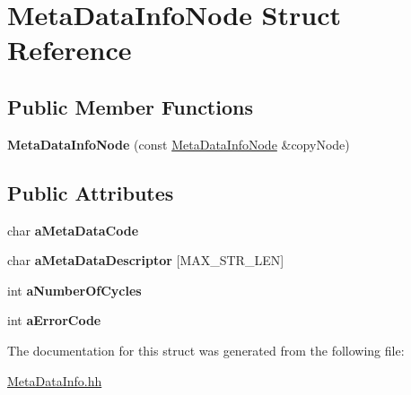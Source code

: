 \hypertarget{struct_meta_data_info_node}{}\section{Meta\+Data\+Info\+Node Struct Reference}
\label{struct_meta_data_info_node}
\subsection*{Public Member Functions}
\begin{DoxyCompactItemize}
\item 
{\bfseries Meta\+Data\+Info\+Node} (const \hyperlink{struct_meta_data_info_node}{Meta\+Data\+Info\+Node} \&copy\+Node)\hypertarget{struct_meta_data_info_node_a92c4ddf64a5306dedabf40dc80cb5890}{}\label{struct_meta_data_info_node_a92c4ddf64a5306dedabf40dc80cb5890}

\end{DoxyCompactItemize}
\subsection*{Public Attributes}
\begin{DoxyCompactItemize}
\item 
char {\bfseries a\+Meta\+Data\+Code}\hypertarget{struct_meta_data_info_node_ad2ff95de3b8c7028bc91349716d2ce2e}{}\label{struct_meta_data_info_node_ad2ff95de3b8c7028bc91349716d2ce2e}

\item 
char {\bfseries a\+Meta\+Data\+Descriptor} \mbox{[}M\+A\+X\+\_\+\+S\+T\+R\+\_\+\+L\+EN\mbox{]}\hypertarget{struct_meta_data_info_node_a5d3f03e888721e33856adfd9977d5209}{}\label{struct_meta_data_info_node_a5d3f03e888721e33856adfd9977d5209}

\item 
int {\bfseries a\+Number\+Of\+Cycles}\hypertarget{struct_meta_data_info_node_a591b0ddc56a6c6028123b94460f68789}{}\label{struct_meta_data_info_node_a591b0ddc56a6c6028123b94460f68789}

\item 
int {\bfseries a\+Error\+Code}\hypertarget{struct_meta_data_info_node_a03d68e9bc5389434c7e5d1fe220ae9f1}{}\label{struct_meta_data_info_node_a03d68e9bc5389434c7e5d1fe220ae9f1}

\end{DoxyCompactItemize}


The documentation for this struct was generated from the following file\+:\begin{DoxyCompactItemize}
\item 
\hyperlink{_meta_data_info_8hh}{Meta\+Data\+Info.\+hh}\end{DoxyCompactItemize}

